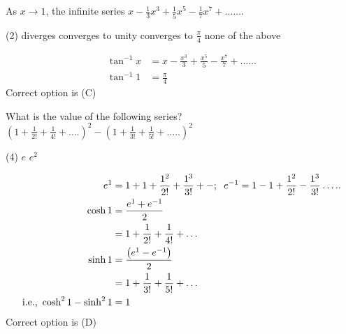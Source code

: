 \begin{questions}
	\section*{}
	
	\begin{minipage}{\textwidth}
		\question As $x \rightarrow 1$, the infinite series $x-\frac{1}{3} x^{3}+\frac{1}{5} x^{5}-\frac{1}{7} x^{7}+\ldots \ldots .$
	\end{minipage}
	\begin{tasks}(2)
		\task[\textbf{A.}] diverges
		\task[\textbf{B.}] converges to unity
		\task[\textbf{C.}]converges to $\frac{\pi}{4}$
		\task[\textbf{D.}]none of the above
	\end{tasks}
	\begin{answer}
		\begin{align*}
		\tan ^{-1} x&=x-\frac{x^{3}}{3}+\frac{x^{5}}{5}-\frac{x^{7}}{7}+\ldots \ldots \\ \tan ^{-1} 1&=\frac{\pi}{4}
		\end{align*}
		Correct option is (C)
	\end{answer}
	
	\begin{minipage}{\textwidth}
		\question What is the value of the following series?\\
		$\left(1+\frac{1}{2 !}+\frac{1}{4 !}+\ldots .\right)^{2}-\left(1+\frac{1}{3 !}+\frac{1}{5 !}+\ldots . .\right)^{2}$
	\end{minipage}
	\begin{tasks}(4)
		\task[\textbf{B.}]$e$
		\task[\textbf{C.}]$e^{2}$
	\end{tasks}
	\begin{answer}
		\begin{align*}
		e^{1}&=1+1+\frac{1^{2}}{2 !}+\frac{1^{3}}{3 !}+-; \hspace{0.2cm} e^{-1}=1-1+\frac{1^{2}}{2 !}-\frac{1^{3}}{3 !} \ldots . .\\
		\cosh 1&=\frac{e^{1}+e^{-1}}{2}\\&=1+\frac{1}{2 !}+\frac{1}{4 !}+\ldots\\
		\sinh 1&=\frac{\left(e^{1}-e^{-1}\right)}{2}\\&=1+\frac{1}{3 !}+\frac{1}{5 !}+\ldots\\
		\text{i.e.,}\ \cosh ^{2} 1-\sinh ^{2} 1&=1
		\end{align*}
		Correct option is (D)
	\end{answer}
	

\end{questions}
